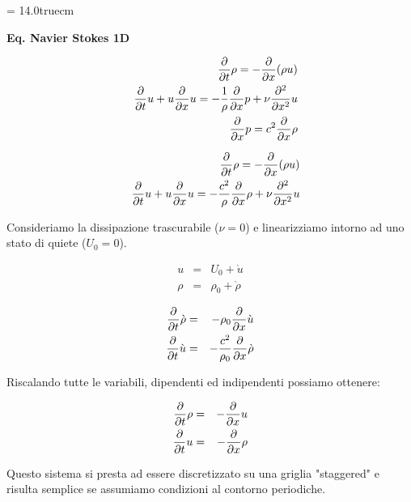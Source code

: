 \documentclass[11pt]{report}
\begin{document}
\pagestyle{empty}
\parindent 0pt
\hsize = 14.0truecm

\newcommand{\dx}{{\partial \over \partial x}}
\newcommand{\dxx}{{\partial^2 \over \partial x^2}}
\newcommand{\dt}{{\partial \over \partial t}}


{\bf  \begin{center} {\large \bf Eq. Navier Stokes 1D }  \end{center} }



\begin{eqnarray*}
   && \dt \rho        = -\dx (\rho u)                              \\
   && \dt u  +u \dx u = -{ 1 \over \rho} \dx p +\nu \dxx u         \\
   && \dx p = c^2 \dx \rho
\end{eqnarray*}


\begin{eqnarray}
   && \dt \rho        = -\dx (\rho u)                               \label{1} \\
   && \dt u  +u \dx u = -{ c^2 \over \rho} \dx \rho +\nu \dxx u     \label{2}
\end{eqnarray}



Consideriamo la dissipazione trascurabile ($\nu=0$) e linearizziamo intorno ad uno stato di quiete ($U_0=0$).

\begin{eqnarray*}
   u &=& U_0 + \grave{u}                              \\
   \rho &=& \rho_0 + \grave{\rho}
\end{eqnarray*}


\begin{eqnarray*}
   \dt \grave{\rho}        &=& -\rho_0\dx \grave{u}                               \\
   \dt \grave{u} &=& -{ c^2 \over \rho_0} \dx \grave{\rho}
\end{eqnarray*}

Riscalando tutte le variabili, dipendenti ed indipendenti possiamo ottenere:

\begin{eqnarray*}
   \dt \rho        &=& -\dx u                               \\
   \dt u &=& - \dx \rho
\end{eqnarray*}


Questo sistema si presta ad essere discretizzato su una griglia "staggered"
e risulta semplice se assumiamo condizioni al contorno periodiche.
\end{document}

